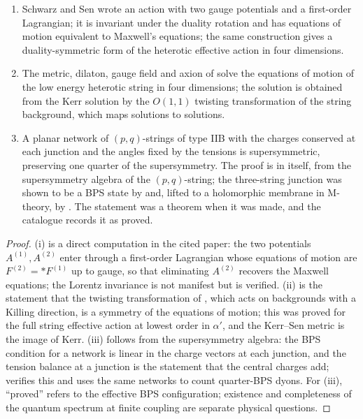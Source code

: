 \begin{proposition}\label{prop:misc}
\begin{enumerate}[leftmargin=1.6em,itemsep=1pt]
\item[(i)] Schwarz and Sen \cite{SchwarzSen94} wrote an action with two gauge potentials and a first-order Lagrangian; it is invariant under the duality rotation and has equations of motion equivalent to Maxwell's equations; the same construction gives a duality-symmetric form of the heterotic effective action in four dimensions.
\item[(ii)] The metric, dilaton, gauge field and axion of \cite{Sen92kerr} solve the equations of motion of the low energy heterotic string in four dimensions; the solution is obtained from the Kerr solution by the $O(1,1)$ twisting transformation of the string background, which maps solutions to solutions.
\item[(iii)] A planar network of $(p,q)$-strings of type IIB with the charges conserved at each junction and the angles fixed by the tensions is supersymmetric, preserving one quarter of the supersymmetry. The proof is in \cite{Sen98network} itself, from the supersymmetry algebra of the $(p,q)$-string; the three-string junction was shown to be a BPS state by \cite{ReyYee98} and, lifted to a holomorphic membrane in M-theory, by \cite{MatsuoOkuyama98}. The statement was a theorem when it was made, and the catalogue records it as proved.
\end{enumerate}
\end{proposition}

\begin{proof}
(i) is a direct computation in the cited paper: the two potentials $A^{(1)}, A^{(2)}$ enter through a first-order Lagrangian whose equations of motion are $F^{(2)} = *F^{(1)}$ up to gauge, so that eliminating $A^{(2)}$ recovers the Maxwell equations; the Lorentz invariance is not manifest but is verified. (ii) is the statement that the twisting transformation of \cite{Sen92kerr}, which acts on backgrounds with a Killing direction, is a symmetry of the equations of motion; this was proved for the full string effective action at lowest order in $\alpha'$, and the Kerr--Sen metric is the image of Kerr. (iii) follows from the supersymmetry algebra: the BPS condition for a network is linear in the charge vectors at each junction, and the tension balance at a junction is the statement that the central charges add; \cite{Sen98network} verifies this and \cite{Sen07junction} uses the same networks to count quarter-BPS dyons. For (iii), ``proved'' refers to the effective BPS configuration; existence and completeness of the quantum spectrum at finite coupling are separate physical questions.
\end{proof}
